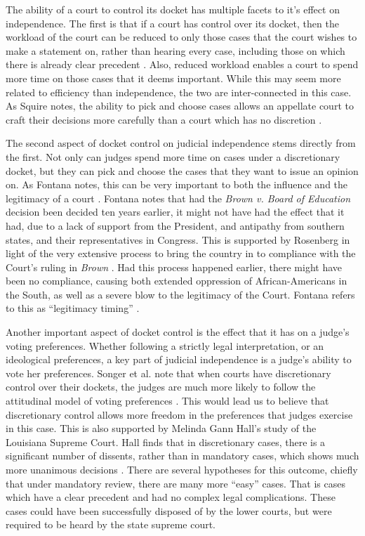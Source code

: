 \documentclass[12pt]{article}
\begin{document}
The ability of a court to control its docket has multiple facets to it's effect on independence.  The first is that if a court has control over its docket, then the workload of the court can be reduced to only those cases that the court wishes to make a statement on, rather than hearing every case, including those on which there is already clear precedent \cite{Maltzman2000}.  Also, reduced workload enables a court to spend more time on those cases that it deems important.  While this may seem more related to efficiency than independence, the two are inter-connected in this case.  As Squire notes, the ability to pick and choose cases allows an appellate court to craft their decisions more carefully than a court which has no discretion \citep{Squire2008}.

The second aspect of docket control on judicial independence stems directly from the first.  Not only can judges spend more time on cases under a discretionary docket, but they can pick and choose the cases that they want to issue an opinion on.  As Fontana notes, this can be very important to both the influence and the legitimacy of a court \citep{Fontana2011}.  Fontana notes that had the \textit{Brown v. Board of Education} decision been decided ten years earlier, it might not have had the effect that it had, due to a lack of support from the President, and antipathy from southern states, and their representatives in Congress.  This is supported by Rosenberg in light of the very extensive process to bring the country in to compliance with the Court's ruling in \textit{Brown} \citep{Rosenberg1991}.  Had this process happened earlier, there might have been no compliance, causing both extended oppression of African-Americans in the South, as well as a severe blow to the legitimacy of the Court.  Fontana refers to this as ``legitimacy timing'' \citep[627]{Fontana2011}.  

Another important aspect of docket control is the effect that it has on a judge's voting preferences.  Whether following a strictly legal interpretation, or an ideological preferences, a key part of judicial independence is a judge's ability to vote her preferences.  Songer et al. note that when courts have discretionary control over their dockets, the judges are much more likely to follow the attitudinal model of voting preferences \citep{Songer2003}.  This would lead us to believe that discretionary control allows more freedom in the preferences that judges exercise in this case.   This is also supported by Melinda Gann Hall's study of the Louisiana Supreme Court.  Hall finds that in discretionary cases, there is a significant number of dissents, rather than in mandatory cases, which shows much more unanimous decisions \citep{Hall1985}.  There are several hypotheses for this outcome, chiefly that under mandatory review, there are many more ``easy'' cases.  That is cases which have a clear precedent and had no complex legal complications.  These cases could have been successfully disposed of by the lower courts, but were required to be heard by the state supreme court.   
\end{document}
